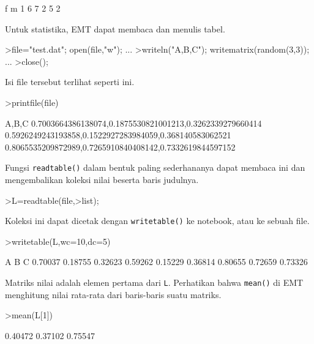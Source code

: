 \documentclass[a4paper,11pt,oneside,enabledeprecatedfontcommands]{scrbook}
\newenvironment{eulernotebook}{}{}
\newenvironment{eulercomment}{\par\medskip\noindent}{\par\medskip}
\begin{document}
\begin{eulernotebook}
\begin{euleroutput}
			               f       m
			       1       6       7
			       2       5       2
		\end{euleroutput}
		\begin{eulercomment}
			Untuk statistika, EMT dapat membaca dan menulis tabel.
		\end{eulercomment}
		\begin{eulerprompt}
			>file="test.dat"; open(file,"w"); ...
			>writeln("A,B,C"); writematrix(random(3,3)); ...
			>close();
		\end{eulerprompt}
		\begin{eulercomment}
			Isi file tersebut terlihat seperti ini.
		\end{eulercomment}
		\begin{eulerprompt}
			>printfile(file)
		\end{eulerprompt}
		\begin{euleroutput}
			A,B,C
			0.7003664386138074,0.1875530821001213,0.3262339279660414
			0.5926249243193858,0.1522927283984059,0.368140583062521
			0.8065535209872989,0.7265910840408142,0.7332619844597152
		\end{euleroutput}
		\begin{eulercomment}
			Fungsi \texttt{readtable()} dalam bentuk paling sederhananya dapat membaca ini dan mengembalikan koleksi nilai
			beserta baris judulnya.
		\end{eulercomment}
		\begin{eulerprompt}
			>L=readtable(file,>list);
		\end{eulerprompt}
		\begin{eulercomment}
			Koleksi ini dapat dicetak dengan \texttt{writetable()} ke notebook, atau ke sebuah file.
		\end{eulercomment}
		\begin{eulerprompt}
			>writetable(L,wc=10,dc=5)
		\end{eulerprompt}
		\begin{euleroutput}
			         A         B         C
			   0.70037   0.18755   0.32623
			   0.59262   0.15229   0.36814
			   0.80655   0.72659   0.73326
		\end{euleroutput}
		\begin{eulercomment}
			Matriks nilai adalah elemen pertama dari \texttt{L}. Perhatikan bahwa \texttt{mean()} di EMT menghitung nilai rata-rata
			dari baris-baris suatu matriks.
		\end{eulercomment}
		\begin{eulerprompt}
			>mean(L[1])
		\end{eulerprompt}
		\begin{euleroutput}
			  0.40472 
			  0.37102 
			  0.75547 
		\end{euleroutput}
		

\end{eulernotebook}
\end{document}
